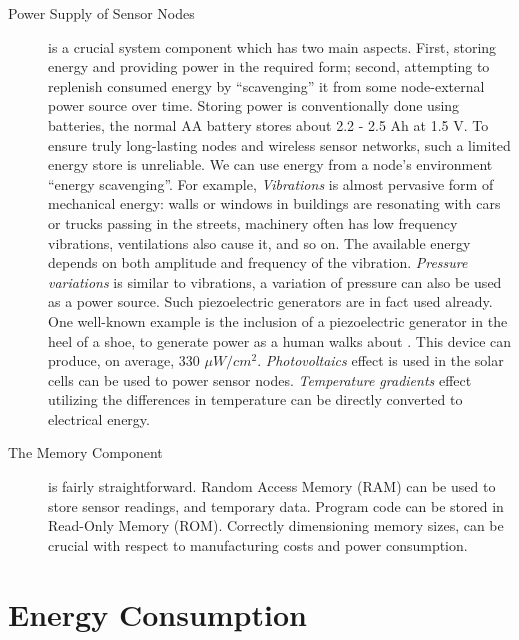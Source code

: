 \begin{description}
	\item[Power Supply of Sensor Nodes] is a crucial system component which has two main aspects.
		First, storing energy and providing power in the required form; second, attempting to replenish consumed energy by ``scavenging'' it from some node-external power source over time.
		Storing power is conventionally done using batteries, the normal AA battery stores about 2.2 - 2.5 Ah at 1.5 V.
		To ensure truly long-lasting nodes and wireless sensor networks, such a limited energy store is unreliable. 
		We can use energy from a node’s environment ``energy scavenging''.
		For example, \textit{Vibrations} is almost pervasive form of mechanical energy: walls or windows in buildings are resonating with cars or trucks passing in the streets, machinery often has low frequency vibrations, ventilations also cause it, and so on.
		The available energy depends on both amplitude and frequency of the vibration.
		\textit{Pressure variations} is similar to vibrations, a variation of pressure can also be used as a power source. 
		Such piezoelectric generators are in fact used already. 
		One well-known example is the inclusion of a piezoelectric generator in the heel of a shoe, to generate power as a human walks about \cite{shenck2001energy}. 
		This device can produce, on average, 330 $\mu W / cm^{2}$. 
		\textit{Photovoltaics} effect is used in the solar cells can be used to power sensor nodes.
		\textit{Temperature gradients} effect utilizing the differences in temperature can be directly converted to electrical energy.

	\item[The Memory Component] is fairly straightforward. 
		Random Access Memory (RAM) can be used to store sensor readings, and temporary data. 
		Program code can be stored in Read-Only Memory (ROM). 
		Correctly dimensioning memory sizes, can be crucial with respect to manufacturing costs and power consumption.
	\end{description}

\section{Energy Consumption}

